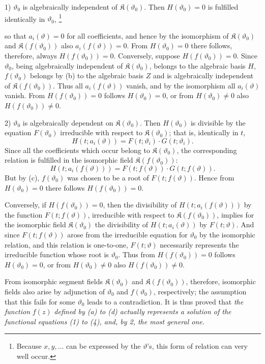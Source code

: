 \documentclass[11pt]{article}
\providecommand{\Kfield}{\mathfrak K}
\providecommand{\Kfield}{\mathfrak{K}}
\providecommand{\srcfn}[2]{%
  \begingroup
  \renewcommand{\thefootnote}{#1}%
  \footnote{#2}%
  \addtocounter{footnote}{-1}%
  \endgroup}
\begin{document}
1) \(\vartheta_0\) is algebraically independent of \(\Kfield(\vartheta_0)\). Then \(H(\vartheta_0)=0\) is fulfilled identically in \(\vartheta_0\),\srcfn{*)}{Because \(x,y,\ldots\) can be expressed by the \(\vartheta\)'s, this form of relation can very well occur.} so that \(a_i(\vartheta)=0\) for all coefficients, and hence by the isomorphism of \(\Kfield(\vartheta_0)\) and \(\Kfield(f(\vartheta_0))\) also \(a_i(f(\vartheta))=0\). From \(H(\vartheta_0)=0\) there follows, therefore, always \(H(f(\vartheta_0))=0\). Conversely, suppose \(H(f(\vartheta_0))=0\). Since \(\vartheta_0\), being algebraically independent of \(\Kfield(\vartheta_0)\), belongs to the algebraic basis \(H\), \(f(\vartheta_0)\) belongs by (b) to the algebraic basis \(Z\) and is algebraically independent of \(\Kfield(f(\vartheta_0))\). Thus all \(a_i(f(\vartheta))\) vanish, and by the isomorphism all \(a_i(\vartheta)\) vanish. From \(H(f(\vartheta_0))=0\) follows \(H(\vartheta_0)=0\), or from \(H(\vartheta_0)\ne0\) also \(H(f(\vartheta_0))\ne0\).

2) \(\vartheta_0\) is algebraically dependent on \(\Kfield(\vartheta_0)\). Then \(H(\vartheta_0)\) is divisible by the equation \(F(\vartheta_0)\) irreducible with respect to \(\Kfield(\vartheta_0)\); that is, identically in \(t\),
\[
H(t;a_i(\vartheta))=F(t;\vartheta_i)\cdot G(t;\vartheta_i).
\]
Since all the coefficients which occur belong to \(\Kfield(\vartheta_0)\), the corresponding relation is fulfilled in the isomorphic field \(\Kfield(f(\vartheta_0))\):
\[
H(t;a_i(f(\vartheta)))=F(t;f(\vartheta))\cdot G(t;f(\vartheta)).
\]
But by (c), \(f(\vartheta_0)\) was chosen to be a root of \(F(t;f(\vartheta))\). Hence from \(H(\vartheta_0)=0\) there follows \(H(f(\vartheta_0))=0\).

Conversely, if \(H(f(\vartheta_0))=0\), then the divisibility of \(H(t;a_i(f(\vartheta)))\) by the function \(F(t;f(\vartheta))\), irreducible with respect to \(\Kfield(f(\vartheta_0))\), implies for the isomorphic field \(\Kfield(\vartheta_0)\) the divisibility of \(H(t;a_i(\vartheta))\) by \(F(t;\vartheta)\). And since \(F(t;f(\vartheta))\) arose from the irreducible equation for \(\vartheta_0\) by the isomorphic relation, and this relation is one-to-one, \(F(t;\vartheta)\) necessarily represents the irreducible function whose root is \(\vartheta_0\). Thus from \(H(f(\vartheta_0))=0\) follows \(H(\vartheta_0)=0\), or from \(H(\vartheta_0)\ne0\) also \(H(f(\vartheta_0))\ne0\).

From isomorphic segment fields \(\Kfield(\vartheta_0)\) and \(\Kfield(f(\vartheta_0))\), therefore, isomorphic fields also arise by adjunction of \(\vartheta_0\) and \(f(\vartheta_0)\), respectively; the assumption that this fails for some \(\vartheta_0\) leads to a contradiction. It is thus proved that \emph{the function} \(f(z)\) \emph{defined by (a) to (d) actually represents a solution of the functional equations (1) to (4), and, by 2, the most general one}.
\end{document}

